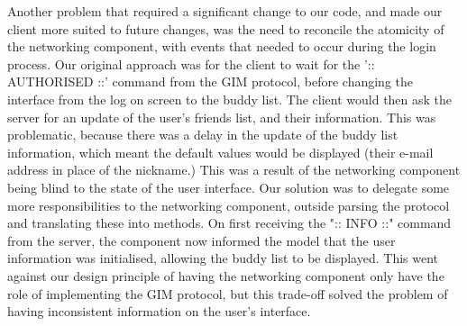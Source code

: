 Another problem that required a significant change to our code, and made our client more suited to future changes, was the need to reconcile the atomicity of the networking component, with events that needed to occur during the login process. Our original approach was for the client to wait for the ':: AUTHORISED ::' command from the GIM protocol, before changing the interface from the log on screen to the buddy list. The client would then ask the server for an update of the user's friends list, and their information. This was problematic, because there was a delay in the update of the buddy list information, which meant the default values would be displayed (their e-mail address in place of the nickname.) This was a result of the networking component being blind to the state of the user interface. Our solution was to delegate some more responsibilities to the networking  component, outside parsing the protocol and translating these into methods. On first receiving the ":: INFO ::" command from the server, the component now informed the model that the user information was initialised, allowing the buddy list to be displayed. This went against our design principle of having the networking component only have the role of implementing the GIM protocol, but this trade-off solved the problem of having inconsistent information on the user's interface. 
